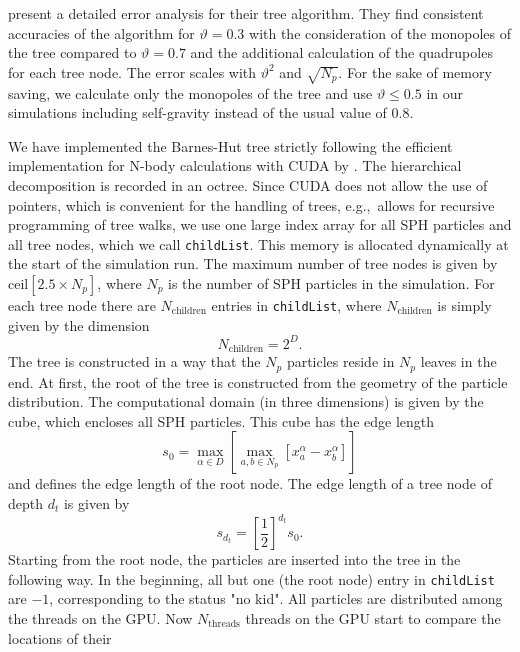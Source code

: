 \documentclass[10pt,fleqn,twoside]{article}
\begin{document}
\cite{1989ApJS...70..389B} present a detailed error analysis for their tree algorithm. They find consistent accuracies
of the algorithm for $\vartheta=0.3$  with the consideration of the monopoles of the tree compared to $\vartheta=0.7$
and the additional calculation of the quadrupoles for each tree node. The error scales with $\vartheta^2$ and $\sqrt{N_p}$. For the sake of memory saving, we calculate only the monopoles of the tree and use
$\vartheta \leq 0.5$ in our simulations including self-gravity instead of the usual value of $0.8$.
%


We have implemented the Barnes-Hut tree strictly following the efficient implementation for N-body calculations with
CUDA by \cite{burtscher:2011}. The hierarchical decomposition is recorded in an octree. Since CUDA does not allow the
use of pointers, which is convenient for the handling of trees, e.g.,\ allows for recursive programming of tree walks, we
use one large index array for all SPH particles and all tree nodes, which we call {\tt childList}. This memory is
allocated dynamically at the start of the simulation run. The maximum
number of tree nodes is given by $\mathrm{ceil}[2.5 \times N_p]$, where $N_p$ is the number of SPH particles in the
simulation. For each tree node there are $N_\mathrm{children}$ entries in {\tt childList}, where $N_\mathrm{children}$
is simply given by the dimension
\begin{equation}
 N_\mathrm{children} = 2^D.
\end{equation}
The tree is constructed in a way that the $N_p$ particles reside in $N_p$ leaves in the end.
At first, the root of the tree is constructed from the geometry of the particle distribution. The computational domain
(in three dimensions) is given by the cube, which encloses all SPH particles. This cube has the edge length
\begin{equation}
 s_0 = \max_{\alpha \in D}  \left[ \max_{a,b \in N_p} \left[ x_a^\alpha - x_b^\alpha \right] \right]
\end{equation}
and defines the edge length of the root node.
The edge length of a tree node of depth $d_t$ is given by
\begin{equation}
 s_{d_t} = \left[ \frac{1}{2}\right]^{d_t} s_0.
\end{equation}
Starting from the root node, the particles are inserted into the tree in the following way. In the beginning, all but
one (the root node) entry in {\tt childList} are $-1$, corresponding to the status "no kid".  All particles are
distributed among the threads on the GPU.  Now $N_\mathrm{threads}$ threads on the GPU start to compare the locations of their
\end{document}
